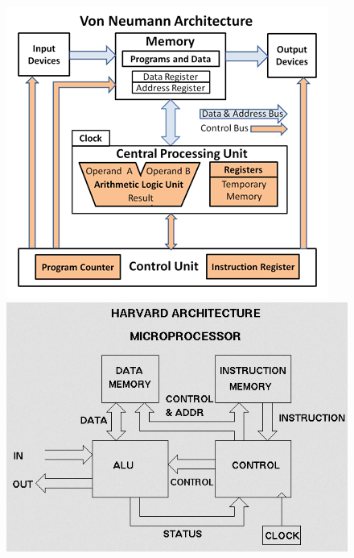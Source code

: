 \begin{figure}[!htb]
  \includegraphics[width=\linewidth]{von_neuman}
\endminipage\hfill
{}
  \includegraphics[width=\linewidth]{harvard_arch}
\endminipage\hfill
\end{figure}


